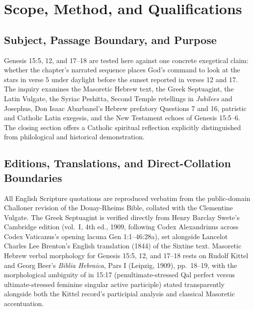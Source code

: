\section{Scope, Method, and Qualifications}

\subsection*{Subject, Passage Boundary, and Purpose}

Genesis 15:5, 12, and 17--18 are tested here against one concrete exegetical claim: whether the chapter's narrated sequence places God's command to look at the stars in verse 5 under daylight before the sunset reported in verses 12 and 17. The inquiry examines the Masoretic Hebrew text, the Greek Septuagint, the Latin Vulgate, the Syriac Peshitta, Second Temple retellings in \emph{Jubilees} and Josephus, Don Isaac Abarbanel's Hebrew prefatory Questions 7 and 16, patristic and Catholic Latin exegesis, and the New Testament echoes of Genesis 15:5--6. The closing section offers a Catholic spiritual reflection explicitly distinguished from philological and historical demonstration.

\subsection*{Editions, Translations, and Direct-Collation Boundaries}

All English Scripture quotations are reproduced verbatim from the public-domain Challoner revision of the Douay-Rheims Bible, collated with the Clementine Vulgate. The Greek Septuagint is verified directly from Henry Barclay Swete's Cambridge edition (vol.~I, 4th ed., 1909, following Codex Alexandrinus across Codex Vaticanus's opening lacuna Gen 1:1--46:28a), set alongside Lancelot Charles Lee Brenton's English translation (1844) of the Sixtine text. Masoretic Hebrew verbal morphology for Genesis 15:5, 12, and 17--18 rests on Rudolf Kittel and Georg Beer's \emph{Biblia Hebraica}, Pars I (Leipzig, 1909), pp.~18--19, with the morphological ambiguity of  in 15:17 (penultimate-stressed Qal perfect versus ultimate-stressed feminine singular active participle) stated transparently alongside both the Kittel record's participial analysis and classical Masoretic accentuation.

